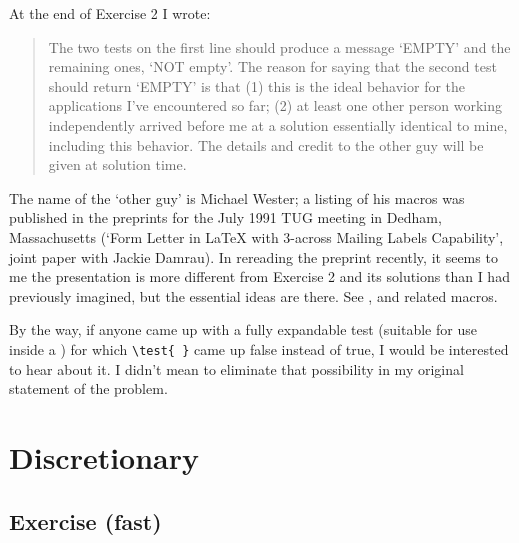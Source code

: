 
At the end of Exercise 2 I wrote:
\begin{quote}
The two tests on the first line should produce a message `EMPTY' and
the remaining ones, `NOT empty'. The reason for saying that the second
test should return `EMPTY' is that (1) this is the ideal behavior for
the applications I've encountered so far; (2) at least one other person
working independently arrived before me at a solution essentially
identical to mine, including this behavior. The details and credit to
the other guy will be given at solution time.
\end{quote}

The name of the `other guy' is Michael Wester; 
a listing of his macros
was published in the preprints for the July 1991 TUG meeting in Dedham,
Massachusetts (`Form Letter in LaTeX with 3-across Mailing Labels
Capability', joint paper with Jackie Damrau). In rereading the preprint
recently, it seems to me the presentation is more different from
Exercise 2 and its solutions than I had previously imagined, but the
essential ideas are there. See \cmd{\wcar}, \cmd{\wcdr} and related macros.

By the way, if anyone came up with a fully expandable test (suitable
for use inside a \cmd{\message}) for which \verb?\test{ }? came up 
false instead of
true, I would be interested to hear about it. I didn't mean to
eliminate that possibility in my original statement of the problem.



\chapter{Discretionary}

\section{Exercise (fast)}


\\

\begin{comment}

[Posted to info-tex on 10 Oct 91; see exercise.001]
**********************************************************************
*** Exercise 3 (fast):
\end{comment}

